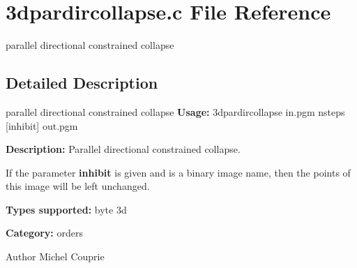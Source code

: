 \section{3dpardircollapse.c File Reference}
\label{3dpardircollapse_8c}


parallel directional constrained collapse  




\subsection{Detailed Description}
parallel directional constrained collapse {\bfseries Usage:} 3dpardircollapse in.pgm nsteps [inhibit] out.pgm

{\bfseries Description:} Parallel directional constrained collapse.

If the parameter {\bfseries inhibit} is given and is a binary image name, then the points of this image will be left unchanged.

{\bfseries Types supported:} byte 3d

{\bfseries Category:} orders

\begin{DoxyAuthor}{Author}
Michel Couprie 
\end{DoxyAuthor}
